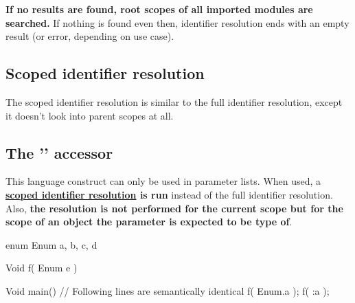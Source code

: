 \textbf{If no results are found, root scopes of all imported modules are searched.} If nothing is found even then, identifier resolution ends with an empty result (or error, depending on use case).

\begin{comment}
\begin{code}
module a;

Void a() {}
Void b() {}

Void f() {
// First, we search in the current scope (inside the function) -> not found
// Then, we search in the parent scope (which is the module scope) -> found function a
a();

Int a;

// Now when we search in the current scope, we find variable a
a = 5;
}

$\moduleSep$
module b;

Void a() {}

class C {

@public:
Void a() {}
Void c() {}
Void f() {

}	

}

class D : @public C {

@public:
Void c() {}
Void g() {

}

}
\end{code}
\end{comment}

\subsection{Scoped identifier resolution} \label{scopedIdentifierResolution}
The scoped identifier resolution is similar to the full identifier resolution, except it doesn't look into parent scopes at all.

\subsection{The '' accessor} \label{colonAccessor}
This language construct can only be used in parameter lists. When used, a \textbf{\hyperref[scopedIdentifierResolution]{scoped identifier resolution} is run} instead of the full identifier resolution. Also, \textbf{the resolution is not performed for the current scope but for the scope of an object the parameter is expected to be type of}.

\begin{code}
	enum Enum {
		a, b, c, d
	}
	
	Void f( Enum e ) {}
	
	Void main() {
		// Following lines are semantically identical
		f( Enum.a );
		f( :a );	
	}
\end{code}


